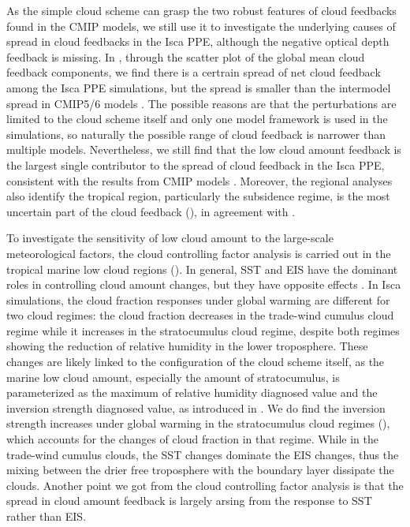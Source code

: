 As the simple cloud scheme can grasp the two robust features of cloud feedbacks found in the CMIP models, we still use it to investigate the underlying causes of spread in cloud feedbacks in the Isca PPE, although the negative optical depth feedback is missing. In , through the scatter plot of the global mean cloud feedback components, we find there is a certrain spread of net cloud feedback among the Isca PPE simulations, but the spread is smaller than the intermodel spread in CMIP5/6 models \citep{Ceppi2017,Zelinka2020causes}. The possible reasons are that the perturbations are limited to the cloud scheme itself and only one model framework is used in the simulations, so naturally the possible range of cloud feedback is narrower than multiple models. Nevertheless, we still find that the low cloud amount feedback is the largest single contributor to the spread of cloud feedback in the Isca PPE, consistent with the results from CMIP models \citep{Zelinka2016insights}. Moreover, the regional analyses also identify the tropical region, particularly the subsidence regime, is the most uncertain part of the cloud feedback (), in agreement with \cite{Bony2005}.

To investigate the sensitivity of low cloud amount to the large-scale meteorological factors, the cloud controlling factor analysis is carried out in the tropical marine low cloud regions (). In general, SST and EIS have the dominant roles in controlling cloud amount changes, but they have opposite effects \citep[e.g.,][]{Qu2014,Qu2015positive,Klein2017low,Scott2020,Cesana2021}. In Isca simulations, the cloud fraction responses under global warming are different for two cloud regimes: the cloud fraction decreases in the trade-wind cumulus cloud regime while it increases in the stratocumulus cloud regime, despite both regimes showing the reduction of relative humidity in the lower troposphere. These changes are likely linked to the configuration of the cloud scheme itself, as the marine low cloud amount, especially the amount of stratocumulus, is parameterized as the maximum of relative humidity diagnosed value and the inversion strength diagnosed value, as introduced in . We do find the inversion strength increases under global warming in the stratocumulus cloud regimes (), which accounts for the changes of cloud fraction in that regime. While in the trade-wind cumulus clouds, the SST changes dominate the EIS changes, thus the mixing between the drier free troposphere with the boundary layer dissipate the clouds. Another point we got from the cloud controlling factor analysis is that the spread in cloud amount feedback is largely arsing from the response to SST rather than EIS.

